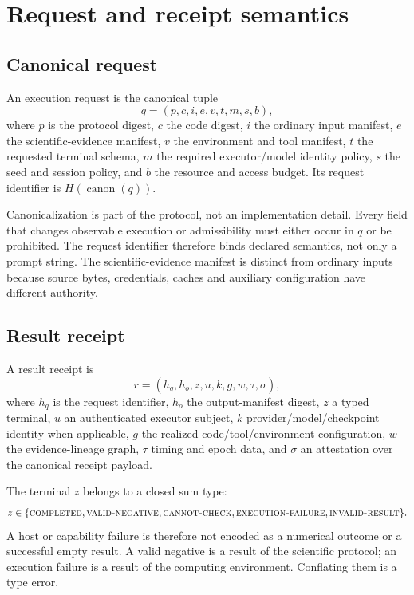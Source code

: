 \section{Request and receipt semantics}

\subsection{Canonical request}

\begin{definition}
An execution request is the canonical tuple
\[
q=(p,c,i,e,v,t,m,s,b),
\]
where $p$ is the protocol digest, $c$ the code digest, $i$ the ordinary input
manifest, $e$ the scientific-evidence manifest, $v$ the environment and tool
manifest, $t$ the requested terminal schema, $m$ the required executor/model
identity policy, $s$ the seed and session policy, and $b$ the resource and access
budget. Its request identifier is $H(\operatorname{canon}(q))$.
\end{definition}

Canonicalization is part of the protocol, not an implementation detail. Every
field that changes observable execution or admissibility must either occur in $q$
or be prohibited. The request identifier therefore binds declared semantics, not
only a prompt string. The scientific-evidence manifest is distinct from ordinary
inputs because source bytes, credentials, caches and auxiliary configuration have
different authority.

\subsection{Result receipt}

\begin{definition}
A result receipt is
\[
r=(h_q,h_o,z,u,k,g,w,\tau,\sigma),
\]
where $h_q$ is the request identifier, $h_o$ the output-manifest digest, $z$ a
typed terminal, $u$ an authenticated executor subject, $k$ provider/model/checkpoint
identity when applicable, $g$ the realized code/tool/environment configuration,
$w$ the evidence-lineage graph, $\tau$ timing and epoch data, and $\sigma$ an
attestation over the canonical receipt payload.
\end{definition}

The terminal $z$ belongs to a closed sum type:
\[
z\in\{\textsc{completed},\textsc{valid-negative},\textsc{cannot-check},
       \textsc{execution-failure},\textsc{invalid-result}\}.
\]
A host or capability failure is therefore not encoded as a numerical outcome or a
successful empty result. A valid negative is a result of the scientific protocol;
an execution failure is a result of the computing environment. Conflating them is
a type error.

